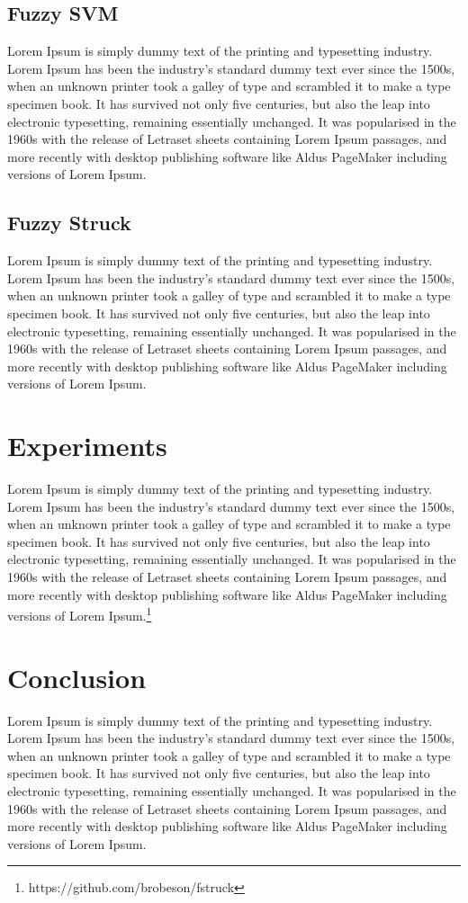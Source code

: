 \documentclass{IEEEtran}
\begin{document}
\subsection{Fuzzy SVM}
Lorem Ipsum is simply dummy text of the printing and typesetting industry. Lorem Ipsum has been the
    industry's standard dummy text ever since the 1500s, when an unknown printer took a galley of
    type and scrambled it to make a type specimen book. It has survived not only five centuries, but
    also the leap into electronic typesetting, remaining essentially unchanged. It was popularised
    in the 1960s with the release of Letraset sheets containing Lorem Ipsum passages, and more
    recently with desktop publishing software like Aldus PageMaker including versions of Lorem
    Ipsum.

\subsection{Fuzzy Struck}
Lorem Ipsum is simply dummy text of the printing and typesetting industry. Lorem Ipsum has been the
    industry's standard dummy text ever since the 1500s, when an unknown printer took a galley of
    type and scrambled it to make a type specimen book. It has survived not only five centuries, but
    also the leap into electronic typesetting, remaining essentially unchanged. It was popularised
    in the 1960s with the release of Letraset sheets containing Lorem Ipsum passages, and more
    recently with desktop publishing software like Aldus PageMaker including versions of Lorem
    Ipsum.

\section{Experiments}
Lorem Ipsum is simply dummy text of the printing and typesetting industry. Lorem Ipsum has been the
    industry's standard dummy text ever since the 1500s, when an unknown printer took a galley of
    type and scrambled it to make a type specimen book. It has survived not only five centuries, but
    also the leap into electronic typesetting, remaining essentially unchanged. It was popularised
    in the 1960s with the release of Letraset sheets containing Lorem Ipsum passages, and more
    recently with desktop publishing software like Aldus PageMaker including versions of Lorem
    Ipsum.\footnote{https://github.com/brobeson/fstruck}

\section{Conclusion}
Lorem Ipsum is simply dummy text of the printing and typesetting industry. Lorem Ipsum has been the
    industry's standard dummy text ever since the 1500s, when an unknown printer took a galley of
    type and scrambled it to make a type specimen book. It has survived not only five centuries, but
    also the leap into electronic typesetting, remaining essentially unchanged. It was popularised
    in the 1960s with the release of Letraset sheets containing Lorem Ipsum passages, and more
    recently with desktop publishing software like Aldus PageMaker including versions of Lorem
    Ipsum.



\end{document}
